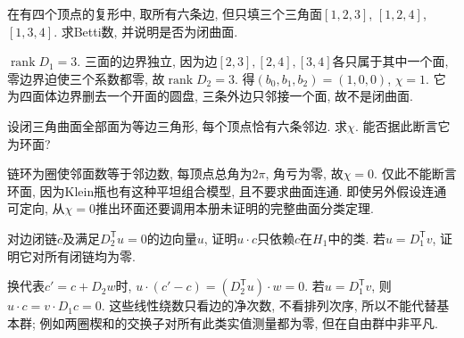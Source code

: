 \begin{exercise}
在有四个顶点的复形中, 取所有六条边, 但只填三个三角面$[1,2,3]$, $[1,2,4]$, $[1,3,4]$. 求Betti数, 并说明是否为闭曲面.
\end{exercise}
\begin{solution}
$\operatorname{rank}D_1=3$. 三面的边界独立, 因为边$[2,3],[2,4],[3,4]$各只属于其中一个面, 零边界迫使三个系数都零, 故$\operatorname{rank}D_2=3$. 得$(b_0,b_1,b_2)=(1,0,0)$, $\chi=1$. 它为四面体边界删去一个开面的圆盘, 三条外边只邻接一个面, 故不是闭曲面.
\end{solution}
\begin{exercise}
设闭三角曲面全部面为等边三角形, 每个顶点恰有六条邻边. 求$\chi$. 能否据此断言它为环面?
\end{exercise}
\begin{solution}
链环为圈使邻面数等于邻边数, 每顶点总角为$2\pi$, 角亏为零, 故$\chi=0$. 仅此不能断言环面, 因为Klein瓶也有这种平坦组合模型, 且不要求曲面连通. 即使另外假设连通可定向, 从$\chi=0$推出环面还要调用本册未证明的完整曲面分类定理.
\end{solution}
\begin{exercise}
对边闭链$c$及满足$D_2^{\mathsf T}u=0$的边向量$u$, 证明$u\cdot c$只依赖$c$在$H_1$中的类. 若$u=D_1^{\mathsf T}v$, 证明它对所有闭链均为零.
\end{exercise}
\begin{solution}
换代表$c'=c+D_2w$时, $u\cdot(c'-c)=(D_2^{\mathsf T}u)\cdot w=0$. 若$u=D_1^{\mathsf T}v$, 则$u\cdot c=v\cdot D_1c=0$. 这些线性绕数只看边的净次数, 不看排列次序, 所以不能代替基本群; 例如两圈楔和的交换子对所有此类实值测量都为零, 但在自由群中非平凡.
\end{solution}
